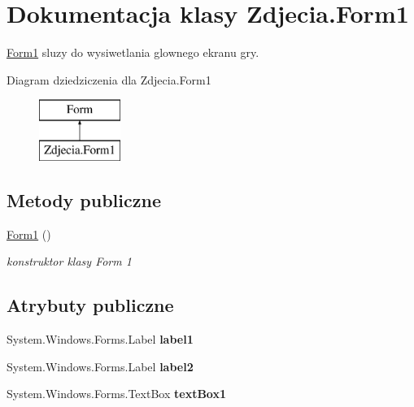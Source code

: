 \hypertarget{class_zdjecia_1_1_form1}{}\section{Dokumentacja klasy Zdjecia.\+Form1}
\label{class_zdjecia_1_1_form1}


\hyperlink{class_zdjecia_1_1_form1}{Form1} sluzy do wysiwetlania glownego ekranu gry.  


Diagram dziedziczenia dla Zdjecia.\+Form1\begin{figure}[H]
\begin{center}
\leavevmode
\includegraphics[height=2.000000cm]{class_zdjecia_1_1_form1}
\end{center}
\end{figure}
\subsection*{Metody publiczne}
\begin{DoxyCompactItemize}
\item 
\hyperlink{class_zdjecia_1_1_form1_aed2fd4d34288702c4cd81d0b1353c218}{Form1} ()\hypertarget{class_zdjecia_1_1_form1_aed2fd4d34288702c4cd81d0b1353c218}{}\label{class_zdjecia_1_1_form1_aed2fd4d34288702c4cd81d0b1353c218}

\begin{DoxyCompactList}\small\item\em konstruktor klasy Form 1 \end{DoxyCompactList}\end{DoxyCompactItemize}
\subsection*{Atrybuty publiczne}
\begin{DoxyCompactItemize}
\item 
System.\+Windows.\+Forms.\+Label {\bfseries label1}\hypertarget{class_zdjecia_1_1_form1_a15aa615fa1a5034315d622c128761a8f}{}\label{class_zdjecia_1_1_form1_a15aa615fa1a5034315d622c128761a8f}

\item 
System.\+Windows.\+Forms.\+Label {\bfseries label2}\hypertarget{class_zdjecia_1_1_form1_ae0dc4ff16396e37af41b6b5dd87d63dc}{}\label{class_zdjecia_1_1_form1_ae0dc4ff16396e37af41b6b5dd87d63dc}

\item 
System.\+Windows.\+Forms.\+Text\+Box {\bfseries text\+Box1}\hypertarget{class_zdjecia_1_1_form1_a960517bc88a4fef5ce90604872eb5038}{}\label{class_zdjecia_1_1_form1_a960517bc88a4fef5ce90604872eb5038}

\end{DoxyCompactItemize}
